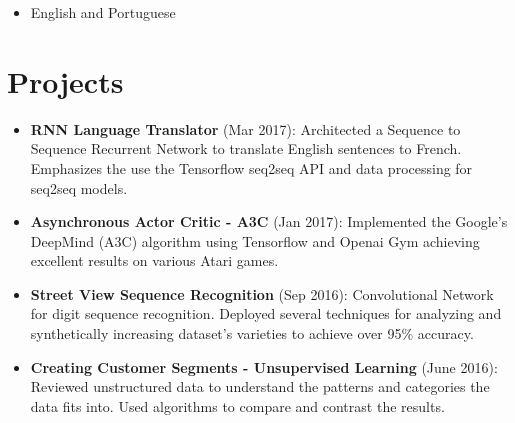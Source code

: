 \documentclass[9pt, a4paper, oneside, final]{scrartcl} %
\begin{document}
\begin{itemize} \itemsep1pt \parskip0pt 
  \item English and Portuguese 
\end{itemize}


\section{Projects}

\begin{itemize}\itemsep2pt \parskip1.5pt 
\item \textbf{RNN Language Translator} (Mar 2017): Architected a Sequence to Sequence Recurrent Network to translate English sentences to French. Emphasizes the use the Tensorflow seq2seq API and data processing for seq2seq models.

\item \textbf{Asynchronous Actor Critic - A3C} (Jan 2017): Implemented the Google's DeepMind (A3C) algorithm using Tensorflow and Openai Gym achieving excellent results on various Atari games.

\item \textbf{Street View Sequence Recognition} (Sep 2016): Convolutional Network for digit sequence recognition. Deployed several techniques for analyzing and synthetically increasing dataset's varieties to achieve over 95\% accuracy.

\item \textbf{Creating Customer Segments - Unsupervised Learning} (June 2016): Reviewed unstructured data to understand the patterns and categories the data fits into.
Used algorithms to compare and contrast the results.
\end{itemize}
\end{document}
